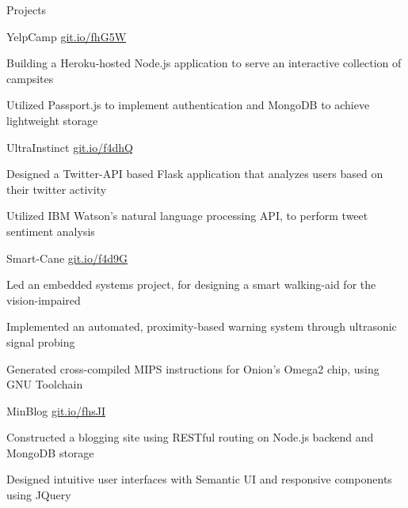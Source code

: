 \documentclass{resume} %
\begin{document}
\begin{rSection}{Projects}
  \vspace{0.25em}
  \begin{rProjectSection}{YelpCamp}
                         {{\href{https://git.io/fhG5W}{git.io/fhG5W}}}
  \item Building a Heroku-hosted Node.js application to serve an interactive collection of campsites
  \item Utilized Passport.js to implement authentication and MongoDB to achieve lightweight storage
  \end{rProjectSection}
  \vspace{-0.25em}
  \begin{rProjectSection}{UltraInstinct}
                         {{\href{https://git.io/f4dhQ}{git.io/f4dhQ}}}
  \item Designed a Twitter-API based Flask application that analyzes users based on their twitter activity
  \item Utilized IBM Watson's natural language processing API, to perform tweet sentiment analysis
  \end{rProjectSection}
  \vspace{-0.25em}
  \begin{rProjectSection}{Smart-Cane}
                         {{\href{https://git.io/f4d9G}{git.io/f4d9G}}}
  \item Led an embedded systems project, for designing a smart 
  walking-aid for the vision-impaired
  \item Implemented an automated, proximity-based warning system through
  ultrasonic signal probing
  \item Generated cross-compiled MIPS instructions for Onion's Omega2 chip, 
  using GNU Toolchain
  \end{rProjectSection}
  \vspace{-0.25em}
  \begin{rProjectSection}{MinBlog}
                         {{\href{https://git.io/fhsJI}{git.io/fhsJI}}}
  \item Constructed a blogging site using RESTful routing on Node.js backend and MongoDB storage
  \item Designed intuitive user interfaces with Semantic UI and responsive components using JQuery  \end{rProjectSection}

\end{rSection}
\vspace{0.25em}
\end{document}
